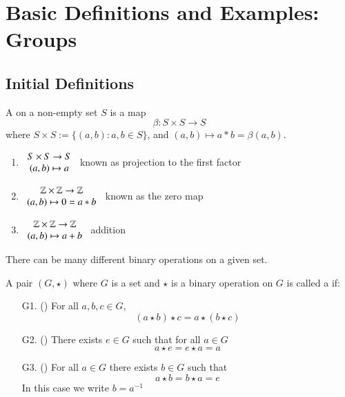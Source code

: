 \chapter{\textsection\textsection Basic Definitions and Examples: Groups}

\section{\textsection Initial Definitions}

\begin{defn}
    A  on a non-empty set $S$ is a map $$\beta:S\times S\rightarrow S$$ where $S\times S := \{(a,b): a,b \in S\}$, and $(a,b)\mapsto a*b = \beta(a,b)$.
\end{defn}

\begin{eg}
    \leavevmode
    \begin{enumerate}
        \item $\begin{array}{c} S\times S\rightarrow S \\ (a,b)\mapsto a \end{array}$ known as projection to the first factor
        \item $\begin{array}{c} \mathbb Z\times \mathbb Z\rightarrow \mathbb Z \\ (a,b)\mapsto 0 = a*b \end{array}$ known as the zero map
        \item $\begin{array}{c} \mathbb Z\times \mathbb Z\rightarrow \mathbb Z \\ (a,b)\mapsto a+b \end{array}$ addition
    \end{enumerate}
    \begin{rmk}
        There can be many different binary operations on a given set.
    \end{rmk}
\end{eg}

\begin{defn}[Group]
    A pair $(G, \star)$ where $G$ is a set and $\star$ is a binary operation on $G$ is called a  if: \begin{enumerate}
        \item[G1.] () For all $a,b,c \in G$, $$(a\star b)\star c = a\star (b\star c)$$
        \item[G2.] () There exists $e \in G$ such that for all $a \in G$ $$a\star e = e \star a = a$$
        \item[G3.] () For all $a \in G$ there exists $b \in G$ such that $$a \star b = b \star a = e$$ In this case we write $b = a^{-1}$
    \end{enumerate}
\end{defn}


